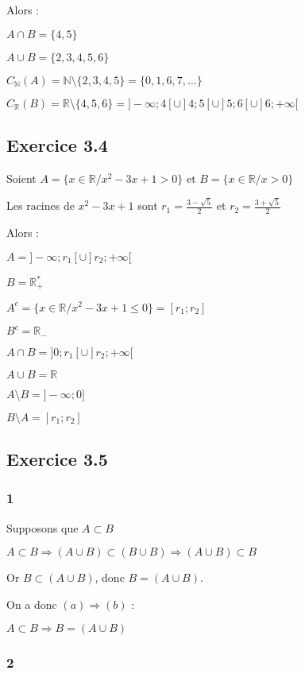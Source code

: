 \documentclass[a4paper,10pt]{report}
\begin{document}
Alors :

$A \cap B = \{4,5\}$

$A \cup B = \{2,3,4,5,6\}$

$C_{\mathbb{N}}(A) = \mathbb{N} \setminus \{2, 3, 4 ,5\} = \{0,1,6,7,\ldots\} $ 

$C_{\mathbb{R}}(B) = \mathbb{R} \setminus \{4,5,6\} = ]-\infty;4[ \cup ]4;5[ \cup ]5;6[ \cup]6; +\infty[ $ 


\subsection*{Exercice 3.4}

Soient $A = \{ x \in \mathbb{R} / x^2-3x+1 >0\}$ et $B = \{x \in \mathbb{R} /x >0\}$


Les racines de $x^2 -3x +1$ sont $r_1 = \frac{3-\sqrt{5}}{2}$ et $r_2 = \frac{3+\sqrt{5}}{2}$


Alors :

$A = ]-\infty; r_1[ \cup ]r_2 ; +\infty[$

$B = \mathbb{R}^*_+$

$A^c = \{ x \in \mathbb{R} / x^2-3x+1 \leq 0\} = [r_1 ; r_2]$

$B^c = \mathbb{R}_{-}$

$A \cap B = ]0; r_1[ \cup ]r_2 ; +\infty[$

$A \cup B = \mathbb{R}$

$A \setminus B = ]-\infty; 0]$

$B \setminus A = [r_1; r_2]$

\subsection*{Exercice 3.5}

\subsubsection*{1}

Supposons que $A \subset B$

$A \subset B \Longrightarrow (A \cup B) \subset (B \cup B) \Longrightarrow (A \cup B) \subset B$

Or $B \subset (A \cup B)$, donc $B = (A \cup B)$.

On a donc $(a) \Longrightarrow (b)$ :

$A \subset B \Longrightarrow B = (A \cup B)$

\subsubsection*{2}
\end{document}
